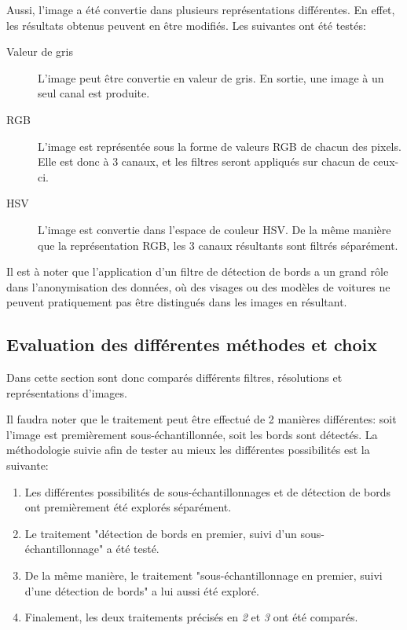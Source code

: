 Aussi, l'image a été convertie dans plusieurs représentations différentes. En effet, les résultats obtenus peuvent en être modifiés. Les suivantes ont été testés:
\begin{description}
    \item[Valeur de gris] L'image peut être convertie en valeur de gris. En sortie, une image à un seul canal est produite.
    \item[RGB] L'image est représentée sous la forme de valeurs RGB de chacun des pixels. Elle est donc à 3 canaux, et les filtres seront appliqués sur chacun de ceux-ci.
    \item[HSV] L'image est convertie dans l'espace de couleur HSV. De la même manière que la représentation RGB, les 3 canaux résultants sont filtrés séparément.
\end{description}

Il est à noter que l'application d'un filtre de détection de bords a un grand rôle dans l'anonymisation des données, où des visages ou des modèles de voitures ne peuvent pratiquement pas être distingués dans les images en résultant.

\subsection{Evaluation des différentes méthodes et choix}
Dans cette section sont donc comparés différents filtres, résolutions et représentations d'images. 

Il faudra noter que le traitement peut être effectué de 2 manières différentes: soit l'image est premièrement sous-échantillonnée, soit les bords sont détectés. La méthodologie suivie afin de tester au mieux les différentes possibilités est la suivante:
\begin{enumerate}
    \item Les différentes possibilités de sous-échantillonnages et de détection de bords ont premièrement été explorés séparément.
    \item Le traitement "détection de bords en premier, suivi d'un sous-échantillonnage" a été testé.
    \item De la même manière, le traitement "sous-échantillonnage en premier, suivi d'une détection de bords" a lui aussi été exploré.
    \item Finalement, les deux traitements précisés en \textit{2} et \textit{3} ont été comparés.
\end{enumerate}

